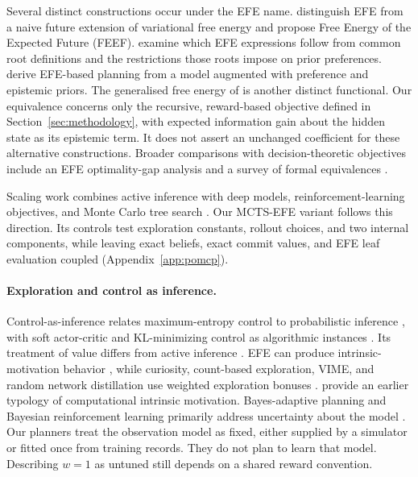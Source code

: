\documentclass[runningheads]{llncs}
\begin{document}
Several distinct constructions occur under the EFE name. \citet{millidge2021} distinguish EFE from a naive future extension of variational free energy and propose Free Energy of the Expected Future (FEEF). \citet{champion2024} examine which EFE expressions follow from common root definitions and the restrictions those roots impose on prior preferences. \citet{devries2025} derive EFE-based planning from a model augmented with preference and epistemic priors. The generalised free energy of \citet{parr2019} is another distinct functional. Our equivalence concerns only the recursive, reward-based objective defined in Section~\ref{sec:methodology}, with expected information gain about the hidden state as its epistemic term. It does not assert an unchanged coefficient for these alternative constructions. Broader comparisons with decision-theoretic objectives include an EFE optimality-gap analysis \citep{wei2024voi} and a survey of formal equivalences \citep{sweeney2026equivalences}.

Scaling work combines active inference with deep models, reinforcement-learning objectives, and Monte Carlo tree search \citep{fountas2020,tschantz2020,maisto2025}. Our MCTS-EFE variant follows this direction. Its controls test exploration constants, rollout choices, and two internal components, while leaving exact beliefs, exact commit values, and EFE leaf evaluation coupled (Appendix~\ref{app:pomcp}).

\paragraph{Exploration and control as inference.}
Control-as-inference relates maximum-entropy control to probabilistic inference \citep{todorov2007,levine2018}, with soft actor-critic and KL-minimizing control as algorithmic instances \citep{haarnoja2018,rawlik2012}. Its treatment of value differs from active inference \citep{millidge2020}. EFE can produce intrinsic-motivation behavior \citep{sajid2021}, while curiosity, count-based exploration, VIME, and random network distillation use weighted exploration bonuses \citep{schmidhuber1991,pathak2017,bellemare2016,houthooft2016,burda2019}. \citet{oudeyer2007} provide an earlier typology of computational intrinsic motivation. Bayes-adaptive planning and Bayesian reinforcement learning primarily address uncertainty about the model \citep{duff2002,guez2013,ghavamzadeh2015}. Our planners treat the observation model as fixed, either supplied by a simulator or fitted once from training records. They do not plan to learn that model. Describing $w=1$ as untuned still depends on a shared reward convention.
\end{document}
